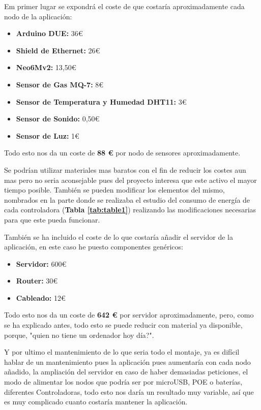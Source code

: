 Em primer lugar se expondrá el coste de que costaría aproximadamente cada nodo de la aplicación:

\begin{itemize}
	\item \textbf{Arduino DUE:} 36\euro 
	\item \textbf{Shield de Ethernet:} 26\euro 
	\item \textbf{Neo6Mv2:} 13,50\euro 
	\item \textbf{Sensor de Gas MQ-7:} 8\euro 
	\item \textbf{Sensor de Temperatura y Humedad DHT11:} 3\euro 
	\item \textbf{Sensor de Sonido:} 0,50\euro 
	\item \textbf{Sensor de Luz:} 1\euro 
\end{itemize}

Todo esto nos da un coste de \textbf{88 \euro} por nodo de sensores aproximadamente.

Se podrían utilizar materiales mas baratos con el fin de reducir los costes aun mas pero no seria aconsejable pues del proyecto interesa que este activo el mayor tiempo posible. También se pueden modificar los elementos del mismo, nombrados en la parte donde se realizaba el estudio del consumo de energía de cada controladora (\textbf{Tabla \ref{tab:table1}}) realizando las modificaciones necesarias para que este pueda funcionar.

También se ha incluido el coste de lo que costaría añadir el servidor de la aplicación, en este caso he puesto componentes genéricos:

\begin{itemize}
	\item \textbf{Servidor:} 600\euro 
	\item \textbf{Router:} 30\euro 
	\item \textbf{Cableado:} 12\euro 
\end{itemize}

Todo esto nos da un coste de \textbf{642 \euro} por servidor aproximadamente, pero, como se ha explicado antes, todo esto se puede reducir con material ya disponible, porque, "quien no tiene un ordenador hoy día?".

Y por ultimo el mantenimiento de lo que seria todo el montaje, ya es difícil hablar de un mantenimiento pues la aplicación pues aumentaría con cada nodo añadido, la ampliación del servidor en caso de haber demasiadas peticiones, el modo de alimentar los nodos que podría ser por microUSB, POE o baterías, diferentes Controladoras, todo esto nos daría un resultado muy variable, así que es muy complicado cuanto costaría mantener la aplicación.

